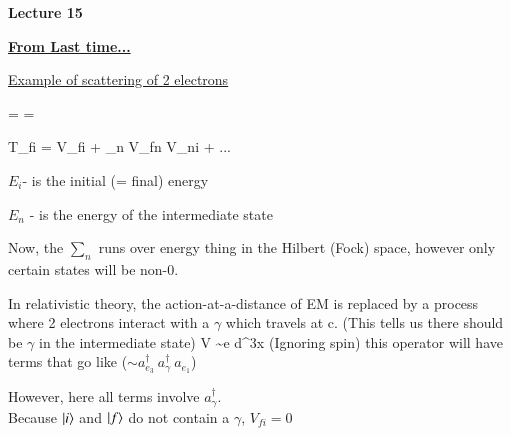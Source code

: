 
\usepackage{braket}
\usepackage{bbm}
\usepackage{relsize}
\usepackage{tcolorbox}



\usepackage{cancel}

\usepackage{fancyhdr}

\fancyhf{}


\thispagestyle{fancy}

\begin{center}
{\huge \textbf{Lecture 15}}
\end{center}

{\fontsize{14}{16}\selectfont

\textbf{\underline{From Last time...}} 

 
\underline{Example of scattering of 2 electrons}

\be
{} =  \hspace*{1in}   = 
\ee


\be
T_{fi} = V_{fi} + \sum_n V_{fn}  V_{ni} + ...
\ee

\bi
\item[-] $E_i$- is the initial (= final) energy
\item[-] $E_n$ - is the energy of the intermediate state
\ei

Now, the $\sum_n$ runs over energy thing in the Hilbert (Fock) space, however only certain states will be non-0.

In relativistic theory, the action-at-a-distance of EM is replaced by a process where 2 electrons interact with a $\gamma$ which travels at c. 
(This tells us there should be $\gamma$ in the intermediate state)
\be
V \sim e \int d^3x \psi \phi \psi  \hspace*{0.3in} \textrm{(Ignoring spin)}
\ee
this operator will have terms that go like ($\sim a_{e_3}^\dagger\ a_{\gamma}^\dagger\ a_{e_1}$)


However, here all terms involve $a_{\gamma}^\dagger$.\\
Because $\ket{i}$ and $\ket{f}$ do not contain a $\gamma$, $  V_{fi} = 0$

}
